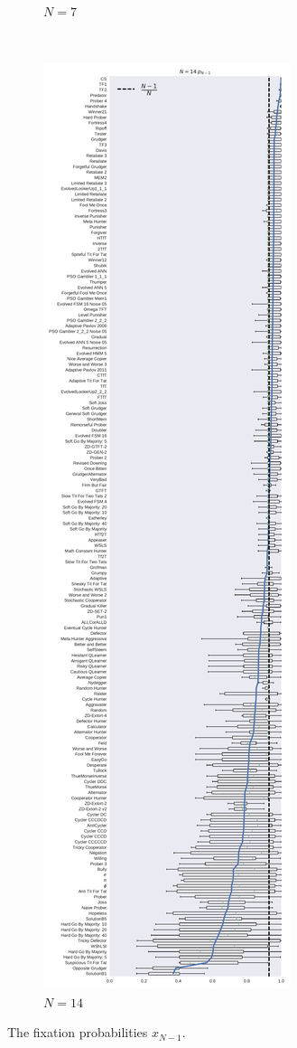 \documentclass[10pt,journal]{IEEEtran}
\begin{document}
\begin{figure}[!hbtp]
\begin{subfigure}{.3\columnwidth}
        \caption{\(N=7\)}
        \label{fig:boxplot_7_resist}
    \end{subfigure}%
    ~
    \begin{subfigure}{.3\columnwidth}
        \centering
        \includegraphics[width=\columnwidth]{img/boxplot_14_resist.pdf}
        \caption{\(N=14\)}
        \label{fig:boxplot_14_resist}
    \end{subfigure}
    \caption{The fixation probabilities \(x_{N-1}\).}
\end{figure}
\end{document}

